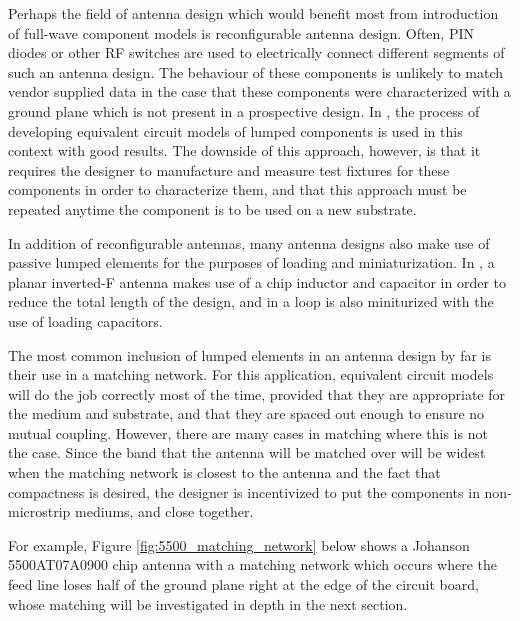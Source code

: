 \documentclass[12pt]{usfcoe}
\begin{document}
    Perhaps the field of antenna design which would benefit most from introduction of full-wave component models is reconfigurable antenna design. 
    Often, PIN diodes or other RF switches are used to electrically connect different segments of such an antenna design. 
    The behaviour of these components is unlikely to match vendor supplied data in the case that these components were characterized with a ground plane which is not present in a prospective design. 
    In \cite{pin_diode_ckt}, the process of developing equivalent circuit models of lumped components is used in this context with good results. 
    The downside of this approach, however, is that it requires the designer to manufacture and measure test fixtures for these components in order to characterize them, and that this approach must be repeated anytime the component is to be used on a new substrate. 
    
    In addition of reconfigurable antennas, many antenna designs also make use of passive lumped elements for the purposes of loading and miniaturization.
    In \cite{pifa_lumped_elements}, a planar inverted-F antenna makes use of a chip inductor and capacitor in order to reduce the total length of the design, and in \cite{mumcuCapacitors} a loop is also miniturized with the use of loading capacitors. 
    
    The most common inclusion of lumped elements in an antenna design by far is their use in a matching network. 
    For this application, equivalent circuit models will do the job correctly most of the time, provided that they are appropriate for the medium and substrate, and that they are spaced out enough to ensure no mutual coupling. 
    However, there are many cases in matching where this is not the case.
    Since the band that the antenna will be matched over will be widest when the matching network is closest to the antenna and the fact that compactness is desired, the designer is incentivized to put the components in non-microstrip mediums, and close together. 

    For example, Figure \ref{fig:5500_matching_network} below shows a Johanson 5500AT07A0900 chip antenna with a matching network which occurs where the feed line loses half of the ground plane right at the edge of the circuit board, whose matching will be investigated in depth in the next section. 
    
\end{document}

